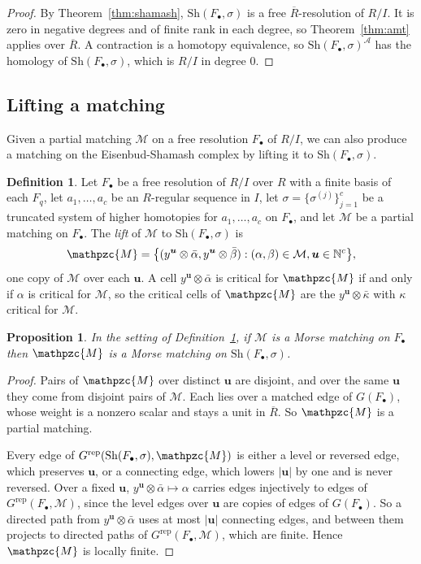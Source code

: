 \documentclass[12pt]{amsart}
\theoremstyle{plain}
\newtheorem{proposition}[theorem]{Proposition}
\theoremstyle{definition}
\newtheorem{definition}[theorem]{Definition}
\newcommand{\F}{ {F_\bullet} }
\newcommand{\Rbar}{\overline{R}}
\newcommand{\M}{\mathcal{M}}
\newcommand{\lift}[1]{\mathpzc{#1}}
\newcommand{\A}{\mathcal{A}}
\newcommand{\Grep}{G^{\mathrm{rep}}}
\newcommand{\N}{\mathbb{N}}
\newcommand{\Sh}{\mathrm{Sh}}
\begin{document}
\begin{proof}
    By Theorem~\ref{thm:shamash}, $\Sh(\F, \sigma)$ is a free $\Rbar$-resolution of $R/I$. It is zero in negative degrees and of finite rank in each degree, so Theorem~\ref{thm:amt} applies over $\Rbar$. A contraction is a homotopy equivalence, so $\Sh(\F, \sigma)^{\A}$ has the homology of $\Sh(\F, \sigma)$, which is $R/I$ in degree $0$.
\end{proof}

\subsection*{Lifting a matching}

Given a partial matching $\M$ on a free resolution $\F$ of $R/I$, we can also produce a matching on the Eisenbud-Shamash complex by lifting it to $\Sh(\F,\sigma)$.

\begin{definition}\label{def:lift}
    Let $\F$ be a free resolution of $R/I$ over $R$ with a finite basis of each $F_q$, let $a_1, \dots, a_c$ be an $R$-regular sequence in $I$, let $\sigma = \{\sigma^{(j)}\}_{j=1}^c$ be a truncated system of higher homotopies for $a_1, \dots, a_c$ on $\F$, and let $\M$ be a partial matching on $\F$. The \emph{lift} of $\M$ to $\Sh(\F, \sigma)$ is
    \[
        \lift{M} = \bigl\{ (y^{\boldsymbol{u}} \otimes \bar\alpha, y^{\boldsymbol{u}} \otimes \bar\beta) : (\alpha, \beta) \in \M, \boldsymbol{u} \in \N^c \bigr\},
    \]
    one copy of $\M$ over each $\boldsymbol{u}$. A cell $y^{\boldsymbol{u}} \otimes \bar\alpha$ is critical for $\lift{M}$ if and only if $\alpha$ is critical for $\M$, so the critical cells of $\lift{M}$ are the $y^{\boldsymbol{u}} \otimes \bar\kappa$ with $\kappa$ critical for $\M$.
\end{definition}

\begin{proposition}\label{prop:lift}
    In the setting of Definition~\ref{def:lift}, if $\M$ is a Morse matching on $\F$ then $\lift{M}$ is a Morse matching on $\Sh(\F, \sigma)$.
\end{proposition}

\begin{proof}
    Pairs of $\lift{M}$ over distinct $\boldsymbol{u}$ are disjoint, and over the same $\boldsymbol{u}$ they come from disjoint pairs of $\M$. Each lies over a matched edge of $G(\F)$, whose weight is a nonzero scalar and stays a unit in $\Rbar$. So $\lift{M}$ is a partial matching.

    Every edge of $\Grep(\Sh(\F, \sigma), \lift{M})$ is either a level or reversed edge, which preserves $\boldsymbol{u}$, or a connecting edge, which lowers $|\boldsymbol{u}|$ by one and is never reversed. Over a fixed $\boldsymbol{u}$, $y^{\boldsymbol{u}} \otimes \bar\alpha \mapsto \alpha$ carries edges injectively to edges of $\Grep(\F, \M)$, since the level edges over $\boldsymbol{u}$ are copies of edges of $G(\F)$. So a directed path from $y^{\boldsymbol{u}} \otimes \bar\alpha$ uses at most $|\boldsymbol{u}|$ connecting edges, and between them projects to directed paths of $\Grep(\F, \M)$, which are finite. Hence $\lift{M}$ is locally finite.
\end{proof}
\end{document}

